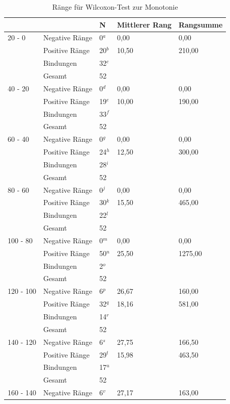 \documentclass[a4paper]{thesis}
\begin{document}
\begin{table}[H]
\centering
\caption{Ränge für Wilcoxon-Test zur Monotonie}
\label{Ränge für Wilcoxon-Test zur Monotonie}
\begin{tabular}{l|l|l|l|l}
&  & N & Mittlerer Rang & Rangsumme \\
\hline
20 - 0 & Negative Ränge & 0$^a$ & 0,00 & 0,00 \\
& Positive Ränge & 20$^b$ & 10,50 & 210,00 \\
& Bindungen & 32$^c$ &  &  \\
& Gesamt & 52 &  &  \\
\hline
40 - 20 & Negative Ränge & 0$^d$ & 0,00 & 0,00 \\
& Positive Ränge & 19$^e$ & 10,00 & 190,00 \\
& Bindungen & 33$^f$ &  &  \\
& Gesamt & 52 &  &  \\
\hline
60 - 40 & Negative Ränge & 0$^g$ & 0,00 & 0,00 \\
& Positive Ränge & 24$^h$ & 12,50 & 300,00 \\
& Bindungen & 28$^i$ &  &  \\
& Gesamt & 52 &  &  \\
\hline
80 - 60 & Negative Ränge & 0$^j$ & 0,00 & 0,00 \\
& Positive Ränge & 30$^k$ & 15,50 & 465,00 \\
& Bindungen & 22$^l$ &  &  \\
& Gesamt & 52 &  &  \\
\hline
100 - 80 & Negative Ränge & 0$^m$ & 0,00 & 0,00 \\
& Positive Ränge & 50$^n$ & 25,50 & 1275,00 \\
& Bindungen & 2$^o$ &  &  \\
& Gesamt & 52 &  &  \\
\hline
120 - 100 & Negative Ränge & 6$^p$ & 26,67 & 160,00 \\
& Positive Ränge & 32$^q$ & 18,16 & 581,00 \\
& Bindungen & 14$^r$ &  &  \\
& Gesamt & 52 &  &  \\
\hline
140 - 120 & Negative Ränge & 6$^s$ & 27,75 & 166,50 \\
& Positive Ränge & 29$^t$ & 15,98 & 463,50 \\
& Bindungen & 17$^u$ &  &  \\
& Gesamt & 52 &  &  \\
\hline
160 - 140 & Negative Ränge & 6$^v$ & 27,17 & 163,00 \\

\end{tabular}
\end{table}
\end{document}
